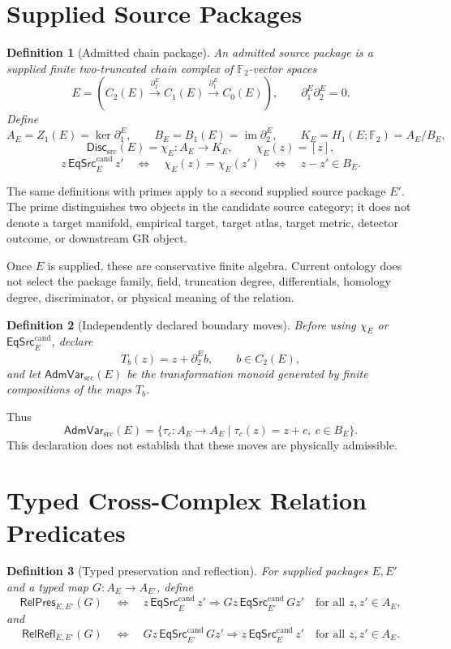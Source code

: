 \documentclass[11pt]{article}
\newtheorem{definition}{Definition}
\newcommand{\Ftwo}{\mathbb F_2}
\newcommand{\Disc}{\mathsf{Disc}_{\mathrm{src}}}
\newcommand{\AdmVar}{\mathsf{AdmVar}_{\mathrm{src}}}
\newcommand{\EqCand}{\mathsf{EqSrc}^{\mathrm{cand}}}
\newcommand{\RelPres}{\mathsf{RelPres}}
\newcommand{\RelRefl}{\mathsf{RelRefl}}
\begin{document}
\section{Supplied Source Packages}

\begin{definition}[Admitted chain package]
An admitted source package is a supplied finite two-truncated chain complex of
\(\Ftwo\)-vector spaces
\[
E=\left(C_2(E)\xrightarrow{\partial_2^E}
C_1(E)\xrightarrow{\partial_1^E}C_0(E)\right),
\qquad \partial_1^E\partial_2^E=0.
\]
Define
\[
A_E=Z_1(E)=\ker\partial_1^E,\qquad
B_E=B_1(E)=\operatorname{im}\partial_2^E,\qquad
K_E=H_1(E;\Ftwo)=A_E/B_E,
\]
\[
\Disc(E)=\chi_E:A_E\to K_E,\qquad \chi_E(z)=[z],
\]
\[
z\,\EqCand_E\,z'
\quad\Longleftrightarrow\quad
\chi_E(z)=\chi_E(z')
\quad\Longleftrightarrow\quad z-z'\in B_E.
\]
\end{definition}

The same definitions with primes apply to a second supplied source package
\(E'\). The prime distinguishes two objects in the candidate source category;
it does not denote a target manifold, empirical target, target atlas, target
metric, detector outcome, or downstream GR object.

Once \(E\) is supplied, these are conservative finite algebra. Current
ontology does not select the package family, field, truncation degree,
differentials, homology degree, discriminator, or physical meaning of the
relation.

\begin{definition}[Independently declared boundary moves]
Before using \(\chi_E\) or \(\EqCand_E\), declare
\[
T_b(z)=z+\partial_2^E b,\qquad b\in C_2(E),
\]
and let \(\AdmVar(E)\) be the transformation monoid generated by finite
compositions of the maps \(T_b\).
\end{definition}

Thus
\[
\AdmVar(E)=\{\tau_c:A_E\to A_E\mid \tau_c(z)=z+c,\ c\in B_E\}.
\]
This declaration does not establish that these moves are physically
admissible.

\section{Typed Cross-Complex Relation Predicates}

\begin{definition}[Typed preservation and reflection]
For supplied packages \(E,E'\) and a typed map \(G:A_E\to A_{E'}\), define
\[
\RelPres_{E,E'}(G)
\quad\Longleftrightarrow\quad
z\,\EqCand_E\,z'\Longrightarrow
Gz\,\EqCand_{E'}\,Gz'
\quad\text{for all }z,z'\in A_E,
\]
and
\[
\RelRefl_{E,E'}(G)
\quad\Longleftrightarrow\quad
Gz\,\EqCand_{E'}\,Gz'\Longrightarrow
z\,\EqCand_E\,z'
\quad\text{for all }z,z'\in A_E.
\]
\end{definition}
\end{document}
